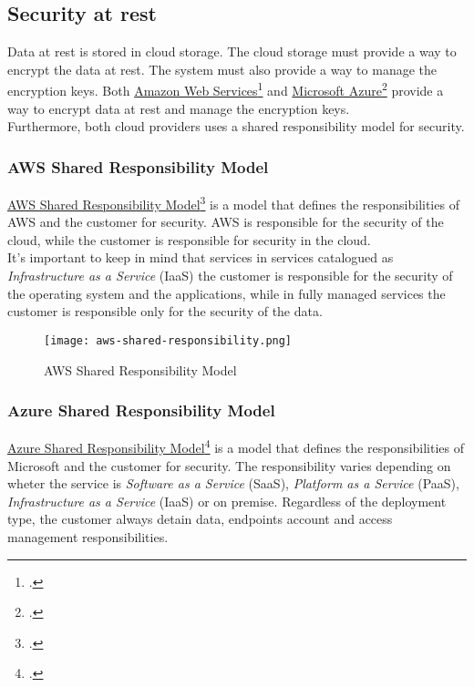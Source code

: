     \subsection{Security at rest}
    Data at rest is stored in cloud storage. The cloud storage must provide a way to encrypt the data at rest. The system must also provide a way to manage the encryption keys. Both \href{https://aws.amazon.com/it/}{Amazon Web Services}\footcite{site:aws} and \href{https://azure.microsoft.com/it-it/}{Microsoft Azure}\footcite{site:azure} provide a way to encrypt data at rest and manage the encryption keys.\\ 
    Furthermore, both cloud providers uses a shared responsibility model for security.
    
    \subsubsection{AWS Shared Responsibility Model}
    \href{https://aws.amazon.com/it/compliance/shared-responsibility-model/}{AWS Shared Responsibility Model}\footcite{site:aws-shared-responsibility-model} is a model that defines the responsibilities of AWS and the customer for security. AWS is responsible for the security of the cloud, while the customer is responsible for security in the cloud.\\
    It's important to keep in mind that services in services catalogued as \textit{Infrastructure as a Service} (IaaS) the customer is responsible for the security of the operating system and the applications, while in fully managed services the customer is responsible only for the security of the data.\\
    \begin{figure}[htbp]
        \centering
        \texttt{[image: aws-shared-responsibility.png]}
        \caption{AWS Shared Responsibility Model}
    \end{figure}

    \subsubsection{Azure Shared Responsibility Model}
    \href{https://learn.microsoft.com/en-us/azure/security/fundamentals/shared-responsibility}{Azure Shared Responsibility Model}\footcite{site:azure-shared-responsibility-model} is a model that defines the responsibilities of Microsoft and the customer for security. The responsibility varies depending on wheter the service is \textit{Software as a Service} (SaaS), \textit{Platform as a Service} (PaaS), \textit{Infrastructure as a Service} (IaaS) or on premise. Regardless of the deployment type, the customer always detain data, endpoints account and access management responsibilities.\\
    
